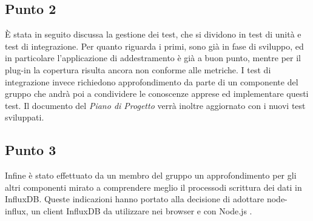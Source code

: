     \subsection{Punto 2}
        È stata in seguito discussa la gestione dei test, che si dividono in test di unità e test di integrazione. Per quanto riguarda i primi, sono già in fase di sviluppo, ed in particolare l'applicazione di addestramento è già a buon punto, mentre per il plug-in la copertura risulta ancora non conforme alle metriche\glo. I test di integrazione invece richiedono approfondimento da parte di un componente del gruppo che andrà poi a condividere le conoscenze apprese ed implementare questi test. Il documento del \textit{Piano di Progetto} verrà inoltre aggiornato con i nuovi test sviluppati.
    \subsection{Punto 3}
        Infine è stato effettuato da un membro del gruppo un approfondimento per gli altri componenti mirato a comprendere meglio il processo\glosp di scrittura dei dati in InfluxDB. Queste indicazioni hanno portato alla decisione di adottare node-influx, un client InfluxDB da utilizzare nei browser e con Node.js .